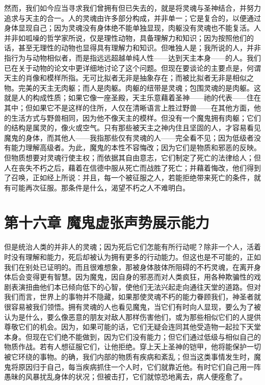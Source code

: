 然而，我们如今应当寻求我们曾拥有但已失去的，就是将灵魂与圣神结合，并努力追求与天主的合一。人的灵魂由许多部分构成，并非单一；它是复合的，以便通过身体显现自己；因为灵魂没有身体绝不能单独显现，肉躯没有灵魂也不能复活。人并非如呱噪的哲学家所说，仅是理性动物，具备理解力和知识；因为按照他们的话，甚至无理性的动物也显得具有理解力和知识。但唯独人是；我所说的人，并非指行为与动物相似者，而是指远远超越单纯人性——达到天主本身——的人。我们已在关于动物的论文中更详细地讨论了这个问题。但现在要谈论的主要点是，何谓天主的肖像和模样所指。无可比拟者无非是抽象存在；而被比拟者无非是相似之物。完美的天主无肉躯；而人是肉躯。肉躯的纽带是灵魂；包围灵魂的是肉躯。这就是人的构成性质；如果它像一座圣殿，天主乐意藉着圣神——祂的代表——住在其中；但如果它不是这样的住所，人仅在清晰语言上胜过野兽——在其他方面，他的生活方式与野兽相同，因为他不像天主的模样。但没有一个魔鬼拥有肉躯；它们的结构是属灵的，像火或空气。只有那些被天主之神内住且坚固的人，才容易看见魔鬼的身体，而其他人——我指那些仅有灵魂的人——完全看不见；因为低级者没有能力理解高级者。为此，魔鬼的本性不容悔改；因为它们是物质和邪恶的反映。但物质想要对灵魂行使主权；而依据其自由意志，它们制定了死亡的法律给人；但人在丧失不朽之后，藉着在信德中服从死亡而战胜了死亡；并藉着悔改，他们得到了召唤，正如经上所说：并且，每一个被征服之人，若能拒绝带来死亡的条件，就有可能再次征服。那条件是什么，渴望不朽之人不难明白。\par


\section{第十六章 魔鬼虚张声势展示能力}

但是统治人类的并非人的灵魂；因为死后它们怎能有所行动呢？除非一个人，活着时没有理解和能力，死后却被认为拥有更多的行动能力。但这也是不可能的，正如我们在别处已证明的。而且很难想象，那被身体肢体所阻碍的不朽灵魂，在离开身体后会变得更有智慧。因为魔鬼，因自身的邪恶而对人类疯狂，用各种欺骗性的戏剧表演扭曲他们本已倾向低下的心智，使他们无法兴起走向通往天堂的道路。但对我们而言，世界上的事物并不隐藏，如果那使灵魂不朽的能力眷顾我们，神圣者就很容易被我们领悟。拥有灵魂的人也看见魔鬼，当它们有时向人显现，要么为了被认为是什么，要么像恶意的朋友对敌人那样伤害他们，或为那些相似它们的人提供尊敬它们的机会。因为，如果可能的话，它们无疑会连同其他受造物一起拉下天堂本身。但现在它们绝不能做到，因为它们没有能力；但它们通过低级与相似自己的物质作战。若有人想征服它们，让他拒绝。穿上天上圣神的铠甲，他将能保护一切被它环绕的事物。的确，我们内部的物质有疾病和紊乱；但当这类事情发生时，魔鬼将原因归于自己，每当疾病抓住一个人时，它们就靠近他。有时它们自己用一阵愚昧的风暴扰乱身体的状况；但被击打，它们就惊恐地离去，病人便痊愈了。\par

